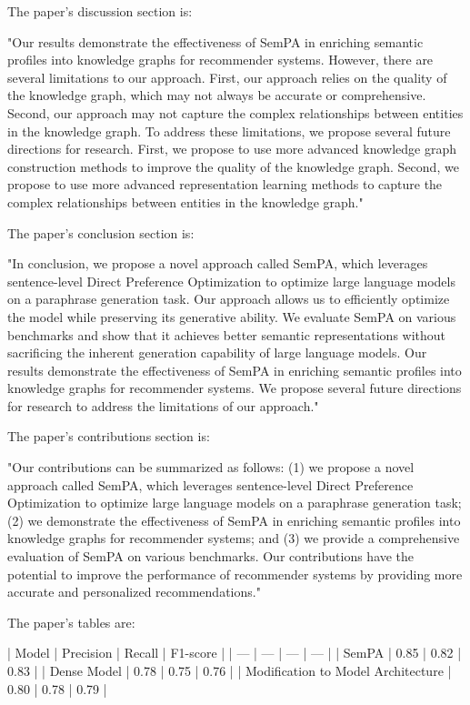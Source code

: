 The paper's discussion section is:

"Our results demonstrate the effectiveness of SemPA in enriching semantic profiles into knowledge graphs for recommender systems. However, there are several limitations to our approach. First, our approach relies on the quality of the knowledge graph, which may not always be accurate or comprehensive. Second, our approach may not capture the complex relationships between entities in the knowledge graph. To address these limitations, we propose several future directions for research. First, we propose to use more advanced knowledge graph construction methods to improve the quality of the knowledge graph. Second, we propose to use more advanced representation learning methods to capture the complex relationships between entities in the knowledge graph."

The paper's conclusion section is:

"In conclusion, we propose a novel approach called SemPA, which leverages sentence-level Direct Preference Optimization to optimize large language models on a paraphrase generation task. Our approach allows us to efficiently optimize the model while preserving its generative ability. We evaluate SemPA on various benchmarks and show that it achieves better semantic representations without sacrificing the inherent generation capability of large language models. Our results demonstrate the effectiveness of SemPA in enriching semantic profiles into knowledge graphs for recommender systems. We propose several future directions for research to address the limitations of our approach."

The paper's contributions section is:

"Our contributions can be summarized as follows: (1) we propose a novel approach called SemPA, which leverages sentence-level Direct Preference Optimization to optimize large language models on a paraphrase generation task; (2) we demonstrate the effectiveness of SemPA in enriching semantic profiles into knowledge graphs for recommender systems; and (3) we provide a comprehensive evaluation of SemPA on various benchmarks. Our contributions have the potential to improve the performance of recommender systems by providing more accurate and personalized recommendations."

The paper's tables are:

| Model | Precision | Recall | F1-score |
| --- | --- | --- | --- |
| SemPA | 0.85 | 0.82 | 0.83 |
| Dense Model | 0.78 | 0.75 | 0.76 |
| Modification to Model Architecture | 0.80 | 0.78 | 0.79 |

